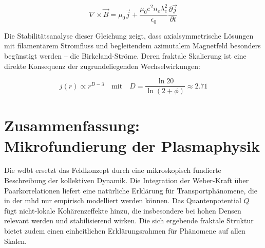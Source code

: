 \begin{equation}
    \label{eq:birkeland_ampere}
    \nabla \times \vec{B} = \mu_0 \vec{j} + \frac{\mu_0 e^2 n_e \lambda_c^2}{\epsilon_0} \frac{\partial \vec{j}}{\partial t}
\end{equation}

Die Stabilitätsanalyse dieser Gleichung zeigt, dass axialsymmetrische Lösungen mit filamentärem Stromfluss und begleitendem azimutalem Magnetfeld besonders begünstigt werden – die Birkeland-Ströme.
Deren fraktale Skalierung ist eine direkte Konsequenz der zugrundeliegenden Wechselwirkungen:

\begin{equation}
    \label{eq:fractal_scaling}
    j(r) \propto r^{D-3} \quad \text{mit} \quad D = \frac{\ln 20}{\ln(2+\phi)} \approx 2.71
\end{equation}

\section{Zusammenfassung: Mikrofundierung der Plasmaphysik}
Die \gls{wdbt} ersetzt das Feldkonzept durch eine mikroskopisch fundierte Beschreibung der kollektiven Dynamik. Die Integration der Weber-Kraft über Paarkorrelationen liefert eine natürliche Erklärung
für Transportphänomene, die in der \gls{mhd} nur empirisch modelliert werden können. Das Quantenpotential $Q$ fügt nicht-lokale Kohärenzeffekte hinzu, die insbesondere bei hohen Densen relevant werden
und stabilisierend wirken. Die sich ergebende fraktale Struktur bietet zudem einen einheitlichen Erklärungsrahmen für Phänomene auf allen Skalen.
